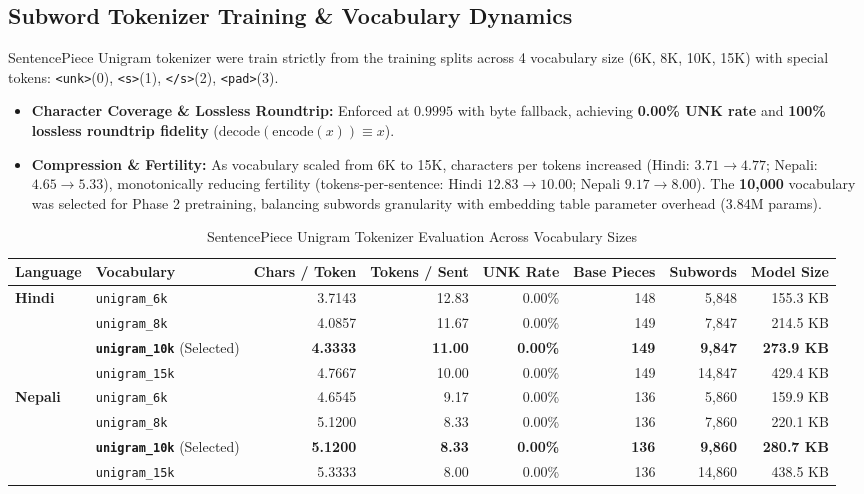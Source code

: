 \documentclass[10pt,a4paper]{article}
\begin{document}
\subsection{Subword Tokenizer Training \& Vocabulary Dynamics}
SentencePiece Unigram tokenizer were train strictly from the training splits across 4 vocabulary size (6K, 8K, 10K, 15K) with special tokens: \texttt{<unk>}(0), \texttt{<s>}(1), \texttt{</s>}(2), \texttt{<pad>}(3).
\begin{itemize}
    \item \textbf{Character Coverage \& Lossless Roundtrip:} Enforced at $0.9995$ with byte fallback, achieving \textbf{0.00\% UNK rate} and \textbf{100\% lossless roundtrip fidelity} ($\text{decode}(\text{encode}(x)) \equiv x$).
    \item \textbf{Compression \& Fertility:} As vocabulary scaled from 6K to 15K, characters per tokens increased (Hindi: $3.71 \to 4.77$; Nepali: $4.65 \to 5.33$), monotonically reducing fertility (tokens-per-sentence: Hindi $12.83 \to 10.00$; Nepali $9.17 \to 8.00$). The \textbf{10,000} vocabulary was selected for Phase 2 pretraining, balancing subwords granularity with embedding table parameter overhead ($3.84\text{M}$ params).
\end{itemize}

\begin{table}[htbp]
\centering
\scriptsize
\caption{SentencePiece Unigram Tokenizer Evaluation Across Vocabulary Sizes}
\label{tab:tokenizer_table}
\begin{tabular*}{\textwidth}{@{\extracolsep{\fill}}llrrrrrr@{}}
\toprule
\textbf{Language} & \textbf{Vocabulary} & \textbf{Chars / Token} & \textbf{Tokens / Sent} & \textbf{UNK Rate} & \textbf{Base Pieces} & \textbf{Subwords} & \textbf{Model Size} \\
\midrule
\multirow{4}{*}{\textbf{Hindi}} 
 & \texttt{unigram\_6k} & 3.7143 & 12.83 & 0.00\% & 148 & 5,848 & 155.3 KB \\
 & \texttt{unigram\_8k} & 4.0857 & 11.67 & 0.00\% & 149 & 7,847 & 214.5 KB \\
 & \textbf{\texttt{unigram\_10k}} (Selected) & \textbf{4.3333} & \textbf{11.00} & \textbf{0.00\%} & \textbf{149} & \textbf{9,847} & \textbf{273.9 KB} \\
 & \texttt{unigram\_15k} & 4.7667 & 10.00 & 0.00\% & 149 & 14,847 & 429.4 KB \\
\midrule
\multirow{4}{*}{\textbf{Nepali}} 
 & \texttt{unigram\_6k} & 4.6545 & 9.17 & 0.00\% & 136 & 5,860 & 159.9 KB \\
 & \texttt{unigram\_8k} & 5.1200 & 8.33 & 0.00\% & 136 & 7,860 & 220.1 KB \\
 & \textbf{\texttt{unigram\_10k}} (Selected) & \textbf{5.1200} & \textbf{8.33} & \textbf{0.00\%} & \textbf{136} & \textbf{9,860} & \textbf{280.7 KB} \\
 & \texttt{unigram\_15k} & 5.3333 & 8.00 & 0.00\% & 136 & 14,860 & 438.5 KB \\
\bottomrule
\end{tabular*}
\end{table}
\end{document}
